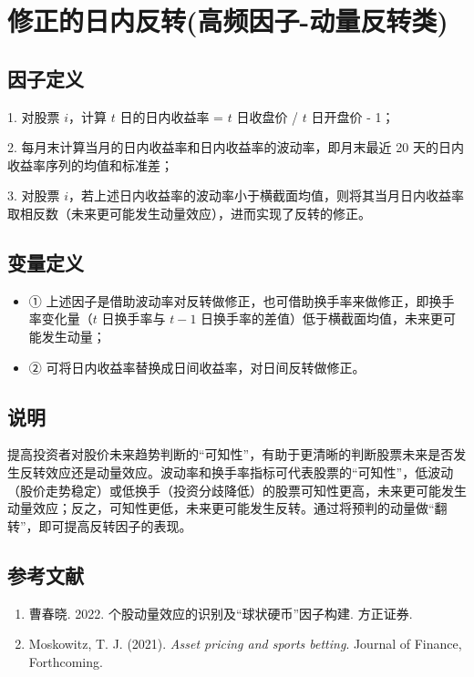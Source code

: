 \documentclass{article}
\begin{document}
\section{修正的日内反转(高频因子-动量反转类)}

\subsection{因子定义}

1. 对股票 \( i \)，计算 \( t \) 日的日内收益率 = \( t \) 日收盘价 / \( t \) 日开盘价 - 1；

2. 每月末计算当月的日内收益率和日内收益率的波动率，即月末最近 20 天的日内收益率序列的均值和标准差；

3. 对股票 \( i \)，若上述日内收益率的波动率小于横截面均值，则将其当月日内收益率取相反数（未来更可能发生动量效应），进而实现了反转的修正。

\subsection{变量定义}
\begin{itemize}
    \item ① 上述因子是借助波动率对反转做修正，也可借助换手率来做修正，即换手率变化量（\( t \) 日换手率与 \( t-1 \) 日换手率的差值）低于横截面均值，未来更可能发生动量；
    \item ② 可将日内收益率替换成日间收益率，对日间反转做修正。
\end{itemize}

\subsection{说明}
提高投资者对股价未来趋势判断的“可知性”，有助于更清晰的判断股票未来是否发生反转效应还是动量效应。波动率和换手率指标可代表股票的“可知性”，低波动（股价走势稳定）或低换手（投资分歧降低）的股票可知性更高，未来更可能发生动量效应；反之，可知性更低，未来更可能发生反转。通过将预判的动量做“翻转”，即可提高反转因子的表现。

\subsection{参考文献}
\begin{enumerate}
    \item 曹春晓. 2022. 个股动量效应的识别及“球状硬币”因子构建. 方正证券.
    \item Moskowitz, T. J. (2021). \textit{Asset pricing and sports betting}. Journal of Finance, Forthcoming.
\end{enumerate}
\end{document}
